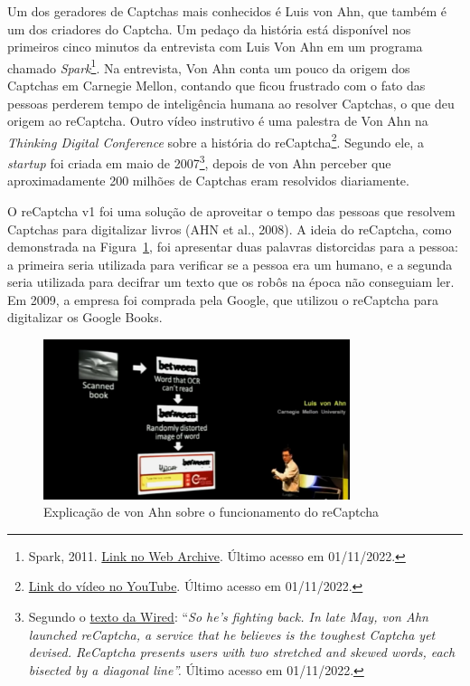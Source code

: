 \documentclass[12pt,twoside,brazilian]{book}
\begin{document}
Um dos geradores de Captchas mais conhecidos é Luis von Ahn, que também
é um dos criadores do Captcha. Um pedaço da história está disponível nos
primeiros cinco minutos da entrevista com Luis Von Ahn em um programa
chamado \emph{Spark}\footnote{Spark, 2011.
  \href{https://web.archive.org/web/20120603142110/http://www.cbc.ca/spark/2011/11/full-interview-luis-von-ahn-on-duolingo/}{Link
  no Web Archive}. Último acesso em 01/11/2022.}. Na entrevista, Von Ahn
conta um pouco da origem dos Captchas em Carnegie Mellon, contando que
ficou frustrado com o fato das pessoas perderem tempo de inteligência
humana ao resolver Captchas, o que deu origem ao reCaptcha. Outro vídeo
instrutivo é uma palestra de Von Ahn na \emph{Thinking Digital
Conference} sobre a história do reCaptcha\footnote{\href{https://www.youtube.com/watch?v=i_5ew4btJiQ}{Link
  do vídeo no YouTube}. Último acesso em 01/11/2022.}. Segundo ele, a
\emph{startup} foi criada em maio de 2007\footnote{Segundo o
  \href{https://www.wired.com/2007/06/ff-humancomp/}{texto da Wired}:
  ``\emph{So he's fighting back. In late May, von Ahn launched
  reCaptcha, a service that he believes is the toughest Captcha yet
  devised. ReCaptcha presents users with two stretched and skewed words,
  each bisected by a diagonal line''.} Último acesso em 01/11/2022.},
depois de von Ahn perceber que aproximadamente 200 milhões de Captchas
eram resolvidos diariamente.

O reCaptcha v1 foi uma solução de aproveitar o tempo das pessoas que
resolvem Captchas para digitalizar livros (AHN et al., 2008). A ideia do
reCaptcha, como demonstrada na Figura~\ref{fig-recaptcha-v1}, foi
apresentar duas palavras distorcidas para a pessoa: a primeira seria
utilizada para verificar se a pessoa era um humano, e a segunda seria
utilizada para decifrar um texto que os robôs na época não conseguiam
ler. Em 2009, a empresa foi comprada pela Google, que utilizou o
reCaptcha para digitalizar os Google Books.

\begin{figure}

{\centering \includegraphics[width=0.8\textwidth,height=\textheight]{./assets/img/recaptcha-v1.png}

}

\caption{\label{fig-recaptcha-v1}Explicação de von Ahn sobre o
funcionamento do reCaptcha}

\end{figure}
\end{document}
